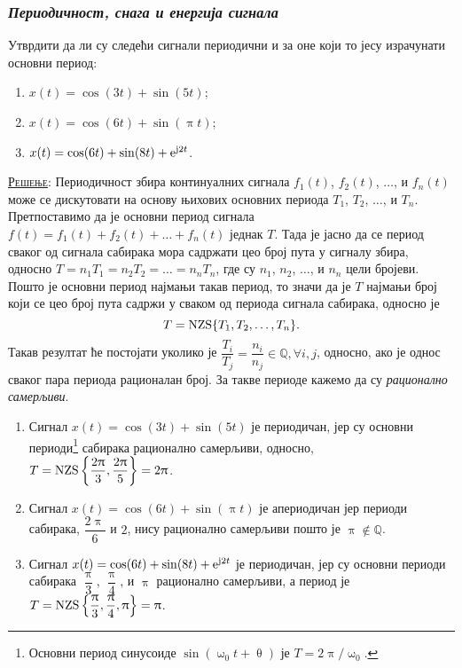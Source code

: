 \subsubsection{\textit{Периодичност, снага и енергија сигнала}}
\PID 
\noindent 
Утврдити да ли су следећи сигнали периодични и за оне који то јесу израчунати 
основни период:
\begin{multicols}{2}
\begin{enumerate}[label=(\alph*)]
\item $x(t) = \cos(3t) + \sin(5t)$;
\item $x(t) = \cos(6t) + \sin(\uppi t)$;
\item $x(t) = \cos(6t) + \sin(8t) + {\rm e}^{{\rm j}2t}$.
\end{enumerate}
\end{multicols}

\textsc{\underline{Решење}}:
Периодичност збира континуалних сигнала $f_1(t)$, $f_2(t)$, $\ldots$, и $f_n(t)$ може се дискутовати на основу њихових основних 
периода $T_1$, $T_2$, $\ldots$, и $T_n$. Претпоставимо да је основни период сигнала 
$f(t) = f_1(t) + f_2(t) + \ldots + f_n(t)$ једнак $T$. Тада је јасно да се период сваког од сигнала сабирака 
мора садржати цео број пута у сигналу збира, односно $T = n_1T_1 = n_2T_2 = \ldots = n_nT_n$, где су $n_1$, $n_2$, $\ldots$, и $n_n$ 
цели бројеви. Пошто је основни период најмањи такав период, то значи да је $T$ најмањи број који се цео број пута 
садржи у сваком од периода сигнала сабирака, односно је
\begin{equation}
    T = {\rm NZS} \{ T_1, T_2, \ldots, T_n\}.
    \label{eq:nzs}
\end{equation}
Такав резултат ће постојати уколико је $\dfrac{T_i}{T_j} = \dfrac{n_i}{n_j} \in \mathbb Q, \forall i,j$,
односно, ако је однос сваког пара периода рационалан број.    
За такве периоде кажемо да су \textit{рационално самерљиви}.

\begin{enumerate}[label=(\alph*)]
    \item Сигнал $x(t) = \cos(3t) + \sin(5t)$ је периодичан, јер су основни периоди\footnote{
    Основни период синусоиде $\sin(\upomega_0 t + \uptheta)$ је $T = 2\uppi /\upomega_0$.
    } сабирака рационално самерљиви, односно,  
    $T = {\rm NZS} \left\{ \dfrac{2\uppi}{3}, \dfrac{2\uppi}{5} \right\} = 2\uppi$. 
    \item Сигнал $x(t) = \cos(6t) + \sin(\uppi t)$ је 
    апериодичан јер периоди сабирака, $\dfrac{2\uppi}{6}$ и $2$, нису рационално самерљиви пошто је 
    $\uppi \not\in \mathbb Q$.
    \item Сигнал $x(t) = \cos(6t) + \sin(8t) + {\rm e}^{{\rm j}2t}$ је периодичан, 
    јер су основни периоди сабирака
    $\dfrac{\uppi}{3}$, $\dfrac{\uppi}{4}$, и $\uppi$ рационално самерљиви, а период
    је $T = {\rm NZS} \left\{ \dfrac{\uppi}{3}, \dfrac{\uppi}{4}, \uppi \right\} = \uppi$.
\end{enumerate}
